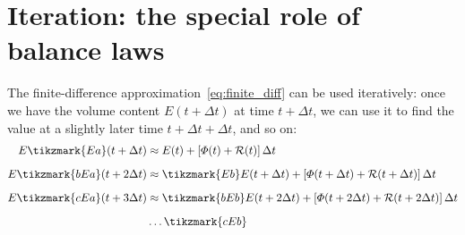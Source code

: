 \documentclass[a4paper,12pt,%
onecolumn,oneside,%
british%
]{memoir}
\newcommand*{\incr}{\Delta}%
\renewcommand*{\|}[1][]{\nonscript\:#1\vert\nonscript\:\mathopen{}}
\newcommand*{\Dt}{\incr t}
\newcommand*{\yE}{E}
\newcommand*{\yH}{\varPhi}%
\newcommand*{\yR}{\mathcal{R}}%
\begin{document}
\section{Iteration: the special role of balance laws}
\label{sec:timestep_iterate}

The finite-difference approximation~\eqref{eq:finite_diff} can be used iteratively: once we have the volume content $\yE(t+\Dt)$ at time $t+\Dt$, we can use it to find the value at a slightly later time $t+\Dt+\Dt$, and so on:
\begin{equation}\label{eq:timestepped_evolution}
  \begin{aligned}[b]
   \yE\tikzmark{Ea}(t+\Dt) &\approx
    \yE(t) + [\yH(t) + \yR(t)]\,\Dt
    \\[2\jot]
    \yE\tikzmark{bEa}(t+2\Dt)  &\approx
    \tikzmark{Eb}\yE(t+\Dt) + [\yH(t+\Dt) + \yR(t+\Dt)]\,\Dt
    \\[2\jot]
    \yE\tikzmark{cEa}(t+3\Dt)  &\approx
    \tikzmark{bEb}\yE(t+2\Dt) + [\yH(t+2\Dt) + \yR(t+2\Dt)]\,\Dt
    \\[2\jot]
    &\dotso\tikzmark{cEb}
  \end{aligned}
\end{equation}
\end{document}
